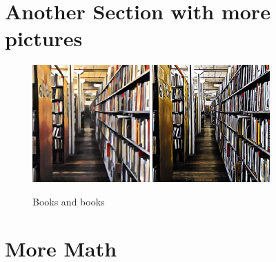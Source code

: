 \documentclass[11pt,letterpaper,twoside]{book}
\begin{document}
\lipsum[10-11]

\section{Another Section with more pictures}

\lipsum[12-13]

\begin{figure}
\centering
\includegraphics[width=0.4\textwidth]{BooksPic1}
\qquad
\includegraphics[width=0.4\textwidth]{BooksPic2}
\caption{\label{fig:path}Books and books}
\end{figure}

\lipsum[13-14]

\section{More Math}

\lipsum[15-16]
\end{document}
